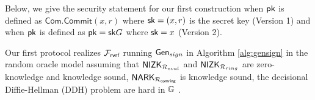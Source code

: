 Below, we give the security statement for our first construction when $ \mathsf{pk} $ is defined as $ \mathsf{Com}.\mathsf{Commit}(x,r) $ where $ \mathsf{sk} = (x, r) $ is the secret key (Version 1) and  when $ \mathsf{pk} $ is defined as $ \mathsf{pk} = \mathsf{sk}G $ where $ \mathsf{sk} = x $  (Version 2).
\begin{theorem}\label{thm:firstprotocol}
	Our first protocol realizes \cite{canetti1,canetti2}  $ \mathcal{F}_{\textsf{rvrf}} $ running $ \mathsf{Gen}_{sign} $ in Algorithm \ref{alg:gensign} in the random oracle model assuming that $ {\mathsf{NIZK}}_{\mathcal{R}_{eval}} $ and $ {\mathsf{NIZK}}_{\mathcal{R}_{ring}}$ are zero-knowledge and knowledge sound, $ \mathsf{NARK}_{\mathcal{R}_{\mathsf{comring}}} $ is knowledge sound, the decisional Diffie-Hellman (DDH) problem are hard in $ {\mathbb{G}}  $ . 
\end{theorem}

